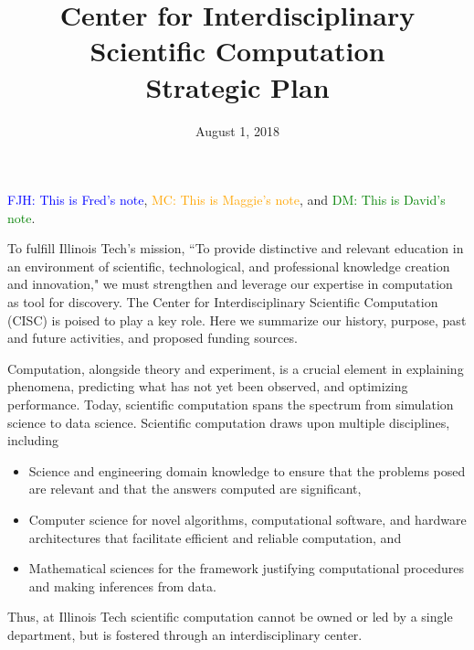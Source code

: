 \documentclass[12pt]{amsart}
\newcommand{\FJHNote}[1]{{\textcolor{blue}{FJH: #1}}}
\newcommand{\DMNote}[1]{{\textcolor{green}{DM: #1}}}
\newcommand{\MCNote}[1]{{\textcolor{orange}{MC: #1}}}
\begin{document}
\FJHNote{This is Fred's note}, \MCNote{This is Maggie's note}, and \DMNote{This is David's note}.

\title[Center for Interdisciplinary Scientific Computation Strategic Plan]{Center for Interdisciplinary Scientific Computation \\ Strategic Plan}
\date{August 1, 2018}
\maketitle


To fulfill Illinois Tech's mission, ``To provide distinctive and relevant education in an environment of scientific, technological, and professional knowledge creation and innovation," we must strengthen and leverage our expertise in computation as tool for discovery.  The Center for Interdisciplinary Scientific Computation (CISC) is poised to play a key role. Here we summarize our history, purpose, past and future activities, and proposed funding sources.

Computation, alongside theory and experiment, is a crucial element in explaining phenomena, predicting what has not yet been observed, and optimizing performance.  Today, scientific computation spans the spectrum from simulation science to data science. Scientific computation draws upon multiple disciplines, including
\begin{itemize}
    \item Science and engineering domain knowledge to ensure that the problems posed are relevant and that the answers computed are significant,
    \item Computer science for novel algorithms, computational software, and hardware architectures that facilitate efficient and reliable computation, and
    \item Mathematical sciences for the framework justifying computational procedures and making inferences from data.
\end{itemize}
Thus, at Illinois Tech scientific computation cannot be owned or led by a single department, but is fostered through an interdisciplinary center.
\end{document}
